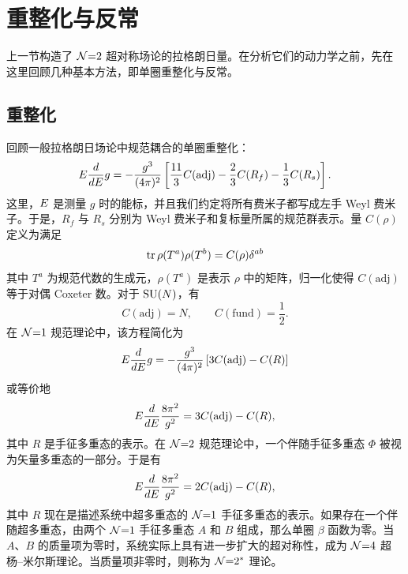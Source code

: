 \section{重整化与反常}\label{sec:renormalization}
上一节构造了 $\mathcal{N}{=}2$ 超对称场论的拉格朗日量。在分析它们的动力学之前，先在这里回顾几种基本方法，即单圈重整化与反常。

\subsection{重整化}
回顾一般拉格朗日场论中规范耦合的单圈重整化：
\begin{equation}
E\frac{d}{dE}g=-\frac{g^3}{(4\pi)^2}\left[
\frac{11}{3}C(\text{adj})-\frac23  C(R_f)-\frac13   C(R_s)
\right].
\end{equation}
这里，$E$ 是测量 $g$ 时的能标，并且我们约定将所有费米子都写成左手 Weyl 费米子。于是，$R_f$ 与 $R_s$ 分别为 Weyl 费米子和复标量所属的规范群表示。量 $C(\rho)$ 定义为满足
\begin{equation}
\mathop{\mathrm{tr}}\nolimits \rho(T^a) \rho(T^b) =C(\rho) \delta^{ab}
\end{equation}
其中 $T^a$ 为规范代数的生成元，$\rho(T^a)$ 是表示 $\rho$ 中的矩阵，归一化使得 $C(\text{adj})$ 等于对偶 Coxeter 数。对于 $\mathop{\mathrm{SU}}(N)$，有
\begin{equation}
C(\text{adj})=N,\qquad C(\text{fund})=\frac12.
\end{equation}
在 $\mathcal{N}{=}1$ 规范理论中，该方程简化为
\begin{equation}
E\frac{d}{dE}g=-\frac{g^3}{(4\pi)^2} \left[
3C(\text{adj})-C(R)
\right]
\end{equation}
或等价地
\begin{equation}
E\frac{d}{dE}\frac{8\pi^2 }{g^2}=
3C(\text{adj})-C(R),\label{n1running}
\end{equation}
其中 $R$ 是手征多重态的表示。在 $\mathcal{N}{=}2$ 规范理论中，一个伴随手征多重态 $\Phi$ 被视为矢量多重态的一部分。于是有
\begin{equation}
E\frac{d}{dE}\frac{8\pi^2 }{g^2}=
2C(\text{adj})-C(R),\label{n2running}
\end{equation}
其中 $R$ 现在是描述系统中超多重态的 $\mathcal{N}{=}1$ 手征多重态的表示。如果存在一个伴随超多重态，由两个 $\mathcal{N}{=}1$ 手征多重态 $A$ 和 $B$ 组成，那么单圈 $\beta$ 函数为零。当 $A$、$B$ 的质量项为零时，系统实际上具有进一步扩大的超对称性，成为 $\mathcal{N}{=}4$ 超杨--米尔斯理论。当质量项非零时，则称为 $\mathcal{N}{=}2^*$ 理论。

